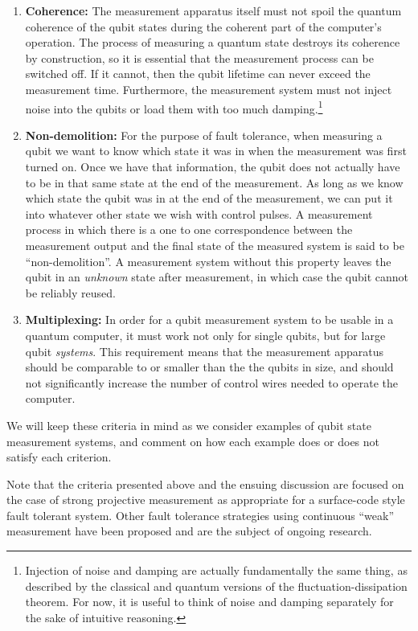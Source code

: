 \begin{enumerate}
\item \textbf{Coherence:} The measurement apparatus itself must not spoil the quantum coherence of the qubit states during the coherent part of the computer's operation. The process of measuring a quantum state destroys its coherence by construction, so it is essential that the measurement process can be switched off. If it cannot, then the qubit lifetime can never exceed the measurement time. Furthermore, the measurement system must not inject noise into the qubits or load them with too much damping.\footnote{Injection of noise and damping are actually fundamentally the same thing, as described by the classical and quantum versions of the fluctuation-dissipation theorem. For now, it is useful to think of noise and damping separately for the sake of intuitive reasoning.}

\item \textbf{Non-demolition:} For the purpose of fault tolerance, when measuring a qubit we want to know which state it was in when the measurement was first turned on. Once we have that information, the qubit does not actually have to be in that same state at the end of the measurement. As long as we know which state the qubit was in at the end of the measurement, we can put it into whatever other state we wish with control pulses. A measurement process in which there is a one to one correspondence between the measurement output and the final state of the measured system is said to be ``non-demolition''. A measurement system without this property leaves the qubit in an \emph{unknown} state after measurement, in which case the qubit cannot be reliably reused.

\item \textbf{Multiplexing:} In order for a qubit measurement system to be usable in a quantum computer, it must work not only for single qubits, but for large qubit \emph{systems}. This requirement means that the measurement apparatus should be comparable to or smaller than the the qubits in size, and should not significantly increase the number of control wires needed to operate the computer.
\end{enumerate}

We will keep these criteria in mind as we consider examples of qubit state measurement systems, and comment on how each example does or does not satisfy each criterion.

Note that the criteria presented above and the ensuing discussion are focused on the case of strong projective measurement as appropriate for a surface-code style fault tolerant system.
Other fault tolerance strategies using continuous ``weak'' measurement have been proposed and are the subject of ongoing research.

